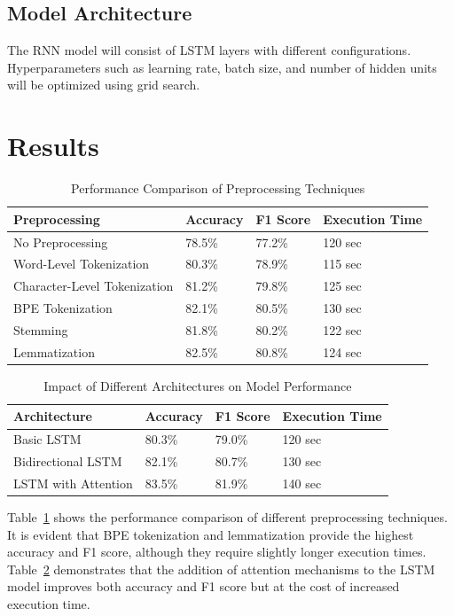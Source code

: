 \documentclass{article}
\begin{document}
\subsection{Model Architecture}
The RNN model will consist of LSTM layers with different configurations. Hyperparameters such as learning rate, batch size, and number of hidden units will be optimized using grid search.

\section{Results}
\begin{table}[ht]
    \centering
    \caption{Performance Comparison of Preprocessing Techniques}
    \label{tab:preprocessing}
    \begin{tabular}{@{}llll@{}}
        \toprule
        Preprocessing & Accuracy & F1 Score & Execution Time \\
        \midrule
        No Preprocessing & 78.5\% & 77.2\% & 120 sec \\
        Word-Level Tokenization & 80.3\% & 78.9\% & 115 sec \\
        Character-Level Tokenization & 81.2\% & 79.8\% & 125 sec \\
        BPE Tokenization & 82.1\% & 80.5\% & 130 sec \\
        Stemming & 81.8\% & 80.2\% & 122 sec \\
        Lemmatization & 82.5\% & 80.8\% & 124 sec \\
        \bottomrule
    \end{tabular}
\end{table}

\begin{table}[ht]
    \centering
    \caption{Impact of Different Architectures on Model Performance}
    \label{tab:architectures}
    \begin{tabular}{@{}llll@{}}
        \toprule
        Architecture & Accuracy & F1 Score & Execution Time \\
        \midrule
        Basic LSTM & 80.3\% & 79.0\% & 120 sec \\
        Bidirectional LSTM & 82.1\% & 80.7\% & 130 sec \\
        LSTM with Attention & 83.5\% & 81.9\% & 140 sec \\
        \bottomrule
    \end{tabular}
\end{table}

Table~\ref{tab:preprocessing} shows the performance comparison of different preprocessing techniques. It is evident that BPE tokenization and lemmatization provide the highest accuracy and F1 score, although they require slightly longer execution times. Table~\ref{tab:architectures} demonstrates that the addition of attention mechanisms to the LSTM model improves both accuracy and F1 score but at the cost of increased execution time.
\end{document}
